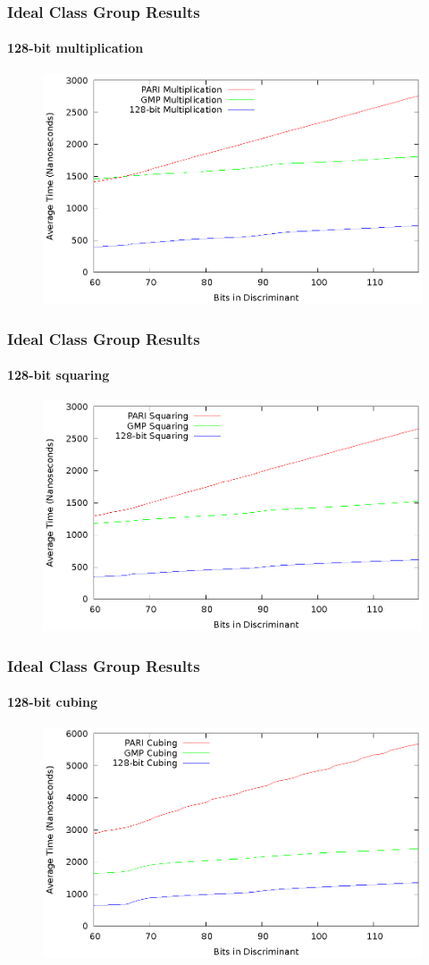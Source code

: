 \documentclass{beamer}
\begin{document}
\begin{frame}
\frametitle{Ideal Class Group Results}
\framesubtitle{128-bit multiplication}
\begin{figure}
\includegraphics[scale=0.86]{compose-128}
\end{figure}
\end{frame}
\begin{frame}
\frametitle{Ideal Class Group Results}
\framesubtitle{128-bit squaring}
\begin{figure}
\includegraphics[scale=0.86]{square-128}
\end{figure}
\end{frame}
\begin{frame}
\frametitle{Ideal Class Group Results}
\framesubtitle{128-bit cubing}
\begin{figure}
\includegraphics[scale=0.86]{cube-128}
\end{figure}
\end{frame}
\end{document}

